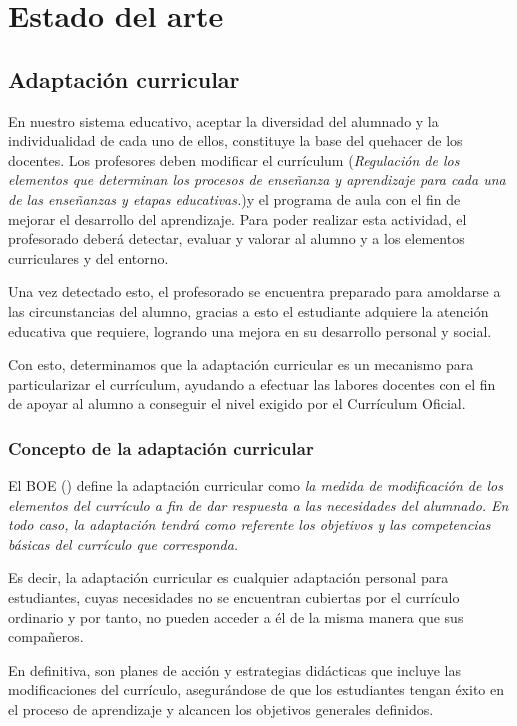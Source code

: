 \chapter{Estado del arte}
\label{cap:estadoDelArte}

\section{Adaptación curricular}
\nocite{adaptacionCurricular}
\nocite{adaptacionCurricular2}
En nuestro sistema educativo, aceptar la diversidad del alumnado y la individualidad de cada uno de ellos, constituye la base del quehacer de los docentes. Los profesores deben modificar el currículum (\textit{Regulación de los elementos que determinan los procesos de enseñanza y aprendizaje para cada una de las enseñanzas y etapas educativas.})y el programa de aula con el fin de mejorar el desarrollo del aprendizaje. Para poder realizar esta actividad, el profesorado deberá detectar, evaluar y valorar al alumno y a los elementos curriculares y del entorno.

Una vez detectado esto, el profesorado se encuentra preparado para amoldarse a las circunstancias del alumno, gracias a esto el estudiante adquiere la atención educativa que requiere, logrando una mejora en su desarrollo personal y social.

Con esto, determinamos que la adaptación curricular es un mecanismo para particularizar el currículum, ayudando a efectuar las labores docentes con el fin de apoyar al alumno a conseguir el nivel exigido por el Currículum Oficial. \nocite{adaptacionIntro} 
 
\subsection{Concepto de la adaptación curricular}
El BOE (\citeyear{BOE}) define la adaptación curricular como \textit{la medida de modificación de los elementos del currículo a fin de dar respuesta a las necesidades del alumnado. En todo caso, la adaptación tendrá como referente los objetivos y las competencias básicas del currículo que corresponda.}

Es decir, la adaptación curricular es cualquier adaptación personal para estudiantes, cuyas necesidades no se encuentran cubiertas por el currículo ordinario y por tanto, no pueden acceder a él de la misma manera que sus compañeros.

En definitiva, son planes de acción y estrategias didácticas que incluye las modificaciones del currículo, asegurándose de que los estudiantes tengan éxito en el proceso de aprendizaje y alcancen los objetivos generales definidos.

